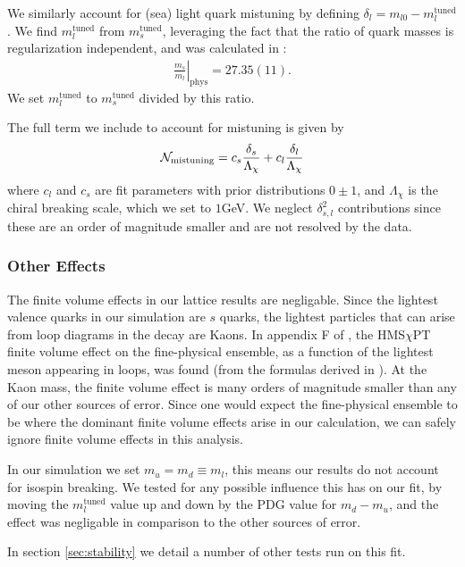 We similarly account for (sea) light quark mistuning by defining $\delta_l = m_{l0} - m_l^{\text{tuned}}$. We find $m_l^{\text{tuned}}$ from $m_s^{\text{tuned}}$, leveraging the fact that the ratio of quark masses is regularization independent, and was calculated in \cite{Bazavov:2014wgs}:
\begin{align}
  \left.\frac{m_s}{m_l}\right\rvert_{\textrm{phys}} = 27.35(11).
\end{align}
We set $m_l^{\text{tuned}}$ to $m_s^{\text{tuned}}$ divided by this ratio.

The full term we include to account for mistuning is given by
\begin{align}
  \mathcal{N}_{\text{mistuning}} = c_s {\delta_s\over \Lambda_{\chi}} + c_l {\delta_l\over \Lambda_{\chi}}
  \label{eq:mistuning}
\end{align}
where $c_l$ and $c_s$ are fit parameters with prior distributions $0\pm 1$, and $\Lambda_{\chi}$ is the chiral breaking scale, which we set to $1$GeV. We neglect $\delta_{s,l}^2$ contributions since these are an order of magnitude smaller and are not resolved by the data.

\subsubsection{Other Effects}

The finite volume effects in our lattice results are negligable. Since the lightest valence quarks in our simulation are $s$ quarks, the lightest particles that can arise from loop diagrams in the decay are Kaons. In appendix F of \cite{Harrison:2017fmw}, the HMS$\chi$PT finite volume effect on the fine-physical ensemble, as a function of the lightest meson appearing in loops, was found (from the formulas derived in \cite{Laiho:2005ue}). At the Kaon mass, the finite volume effect is many orders of magnitude smaller than any of our other sources of error. Since one would expect the fine-physical ensemble to be where the dominant finite volume effects arise in our calculation, we can safely ignore finite volume effects in this analysis.

In our simulation we set $m_u=m_d\equiv m_l$, this means our results do not account for isospin breaking. We tested for any possible influence this has on our fit, by moving the $m_l^{\text{tuned}}$ value up and down by the PDG value for $m_d-m_u$, and the effect was negligable in comparison to the other sources of error.

In section \ref{sec:stability} we detail a number of other tests run on this fit.

